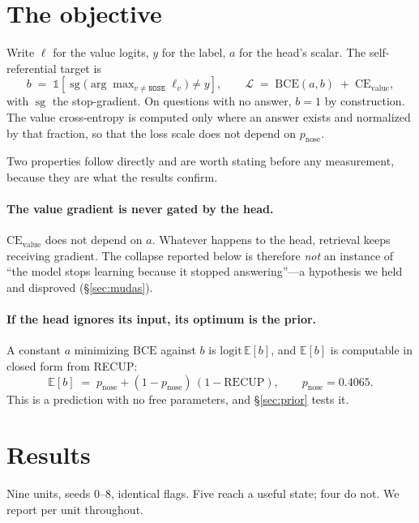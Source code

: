 \documentclass[11pt,a4paper]{article}
\begin{document}
\section{The objective}
\label{sec:objetivo}

Write $\ell$ for the value logits, $y$ for the label, $a$ for the head's scalar. The self-referential
target is
\[
b \;=\; \mathbb{1}\!\left[\operatorname{sg}\!\big(\arg\max\nolimits_{v \neq \texttt{NOSE}} \ell_v\big) \neq y\right],
\qquad
\mathcal{L} \;=\; \mathrm{BCE}(a, b) \;+\; \mathrm{CE}_{\text{value}},
\]
with $\operatorname{sg}$ the stop-gradient. On questions with no answer, $b = 1$ by construction.
The value cross-entropy is computed only where an answer exists and normalized by that fraction, so
that the loss scale does not depend on $p_{\mathrm{nose}}$.

Two properties follow directly and are worth stating before any measurement, because they are what
the results confirm.

\paragraph{The value gradient is never gated by the head.} $\mathrm{CE}_{\text{value}}$ does not
depend on $a$. Whatever happens to the head, retrieval keeps receiving gradient. The collapse
reported below is therefore \emph{not} an instance of ``the model stops learning because it stopped
answering''---a hypothesis we held and disproved (\S\ref{sec:mudas}).

\paragraph{If the head ignores its input, its optimum is the prior.} A constant $a$ minimizing
$\mathrm{BCE}$ against $b$ is $\mathrm{logit}\,\mathbb{E}[b]$, and $\mathbb{E}[b]$ is computable in
closed form from RECUP:
\begin{equation}
\mathbb{E}[b] \;=\; p_{\mathrm{nose}} + (1 - p_{\mathrm{nose}})\,(1 - \mathrm{RECUP}),
\qquad p_{\mathrm{nose}} = 0.4065 .
\label{eq:prior}
\end{equation}
This is a prediction with no free parameters, and \S\ref{sec:prior} tests it.

\section{Results}

Nine units, seeds $0$--$8$, identical flags. Five reach a useful state; four do not. We report per
unit throughout.
\end{document}
